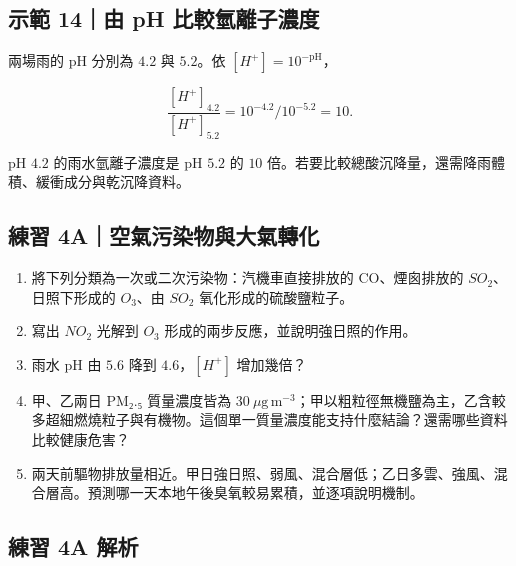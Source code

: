 \documentclass[11pt,a4paper]{article}
\providecommand{\tightlist}{%
  \setlength{\itemsep}{0pt}\setlength{\parskip}{0pt}}
\begin{document}
\begin{HandoutWorkedExample}

\subsection{示範 14｜由 pH 比較氫離子濃度}\label{ux793aux7bc4-14ux7531-ph-ux6bd4ux8f03ux6c2bux96e2ux5b50ux6fc3ux5ea6}

兩場雨的 pH 分別為 \(4.2\) 與 \(5.2\)。依 \([H^+]=10^{-\mathrm{pH}}\)，

\[
\frac{[H^+]_{4.2}}{[H^+]_{5.2}}=10^{-4.2}/10^{-5.2}=10.
\]

pH \(4.2\) 的雨水氫離子濃度是 pH \(5.2\) 的 \(10\) 倍。若要比較總酸沉降量，還需降雨體積、緩衝成分與乾沉降資料。

\end{HandoutWorkedExample}

\subsection{練習 4A｜空氣污染物與大氣轉化}\label{ux7df4ux7fd2-4aux7a7aux6c23ux6c61ux67d3ux7269ux8207ux5927ux6c23ux8f49ux5316}

\begin{enumerate}
\def\labelenumi{\arabic{enumi}.}
\tightlist
\item
  將下列分類為一次或二次污染物：汽機車直接排放的 CO、煙囪排放的 \(SO_2\)、日照下形成的 \(O_3\)、由 \(SO_2\) 氧化形成的硫酸鹽粒子。
\item
  寫出 \(NO_2\) 光解到 \(O_3\) 形成的兩步反應，並說明強日照的作用。
\item
  雨水 pH 由 \(5.6\) 降到 \(4.6\)，\([H^+]\) 增加幾倍？
\item
  甲、乙兩日 PM₂.₅ 質量濃度皆為 \(30\ \mu\mathrm{g\,m^{-3}}\)；甲以粗粒徑無機鹽為主，乙含較多超細燃燒粒子與有機物。這個單一質量濃度能支持什麼結論？還需哪些資料比較健康危害？
\item
  兩天前驅物排放量相近。甲日強日照、弱風、混合層低；乙日多雲、強風、混合層高。預測哪一天本地午後臭氧較易累積，並逐項說明機制。
\end{enumerate}

\subsection{練習 4A 解析}\label{ux7df4ux7fd2-4a-ux89e3ux6790}
\end{document}
